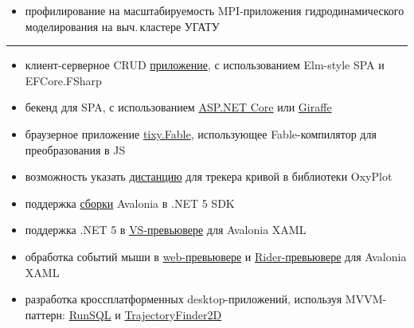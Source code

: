 \documentclass[10pt,a4paper,ragged2e,withhyper]{altacv}
\begin{document}
\begin{paracol}{2}
\begin{itemize}
  \item профилирование на масштабируемость  MPI-приложения
  \newline гидродинамического моделирования на выч.\,кластере УГАТУ

\end{itemize}

{\color{headingrule}\rule{\linewidth}{1pt}\par}\medskip


\smallskip

\begin{itemize}

  \item клиент-серверное CRUD
  \href{https://github.com/rstm-sf/ClientServerCRUD}{приложение},
  с использованием Elm-style SPA и EFCore.FSharp
  \smallskip

  \item бекенд для SPA, с использованием
  \href{https://github.com/rstm-sf/ASP.NETCoreBackendFor-Angular-GettingStarted}{ASP.NET Core} или
  \href{https://github.com/rstm-sf/GiraffeBackendFor-Angular-GettingStarted}{Giraffe}
  \smallskip

  \item браузерное приложение
  \href{https://github.com/rstm-sf/tixy.Fable}{tixy.Fable},
  использующее Fable-компилятор для преобразования в JS
  \smallskip

  \item возможность указать
  \href{https://github.com/oxyplot/oxyplot/pull/1736}{дистанцию}
  для трекера кривой в библиотеки OxyPlot
  \smallskip

  \item поддержка
  \href{https://github.com/AvaloniaUI/Avalonia/pull/5415}{сборки}
  Avalonia в .NET 5 SDK
  \smallskip

  \item поддержка .NET 5 в
  \href{https://github.com/AvaloniaUI/AvaloniaVS/pull/181}{VS-превьювере}
  для Avalonia XAML 
  \smallskip

  \item обработка событий мыши в
  \href{https://github.com/AvaloniaUI/Avalonia/pull/4418}{web-превьювере}
  и \href{https://github.com/ForNeVeR/AvaloniaRider/pull/82}{Rider-превьювере}
  для Avalonia XAML 
  \smallskip

  \item разработка кроссплатформенных desktop-приложений, используя MVVM-паттерн:
  \href{https://github.com/rstm-sf/RunSQL}{RunSQL} и
  \href{https://github.com/rstm-sf/TrajectoryFinder2D}{TrajectoryFinder2D}
  \smallskip


\end{itemize}
\end{paracol}
\end{document}
